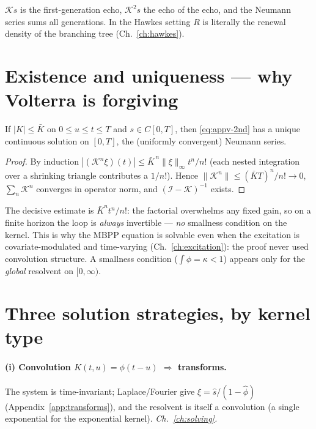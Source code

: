 \begin{intuitionbox}
$\mathcal K s$ is the first-generation echo, $\mathcal K^2 s$ the echo of the echo,
and the Neumann series sums all generations. In the Hawkes setting $R$ is literally
the renewal density of the branching tree (Ch.~\ref{ch:hawkes}).
\end{intuitionbox}

\section{Existence and uniqueness --- why Volterra is forgiving}

\begin{theorem}\label{thm:appv-exist}
If $|K|\le\bar K$ on $0\le u\le t\le T$ and $s\in C[0,T]$, then \eqref{eq:appv-2nd}
has a unique continuous solution on $[0,T]$, the (uniformly convergent) Neumann
series.
\end{theorem}
\begin{proof}
By induction $|(\mathcal K^n\xi)(t)|\le\bar K^{\,n}\|\xi\|_\infty t^n/n!$ (each
nested integration over a shrinking triangle contributes a $1/n!$). Hence
$\|\mathcal K^n\|\le(\bar K T)^n/n!\to0$, $\sum_n\mathcal K^n$ converges in operator
norm, and $(\mathcal I-\mathcal K)^{-1}$ exists.
\end{proof}

\begin{whybox}
The decisive estimate is $\bar K^n t^n/n!$: the factorial overwhelms any fixed gain,
so on a finite horizon the loop is \emph{always} invertible --- \emph{no} smallness
condition on the kernel. This is why the MBPP equation is solvable even when the
excitation is covariate-modulated and time-varying (Ch.~\ref{ch:excitation}): the
proof never used convolution structure. A smallness condition ($\int\phi=\kappa<1$)
appears only for the \emph{global} resolvent on $[0,\infty)$.
\end{whybox}

\section{Three solution strategies, by kernel type}

\paragraph{(i) Convolution $K(t,u)=\phi(t-u)$ $\Rightarrow$ transforms.} The system
is time-invariant; Laplace/Fourier give $\hat\xi=\hat s/(1-\hat\phi)$
(Appendix~\ref{app:transforms}), and the resolvent is itself a convolution
(a single exponential for the exponential kernel). \emph{Ch.~\ref{ch:solving}.}

